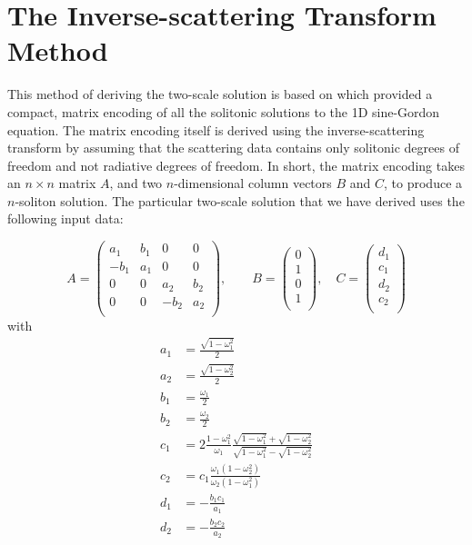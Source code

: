 \documentclass{report}
\begin{document}
\section{The Inverse-scattering Transform Method}
This method of deriving the two-scale solution is based on \cite{:/content/aip/journal/jmp/51/12/10.1063/1.3520596} which provided a compact, matrix encoding of all the solitonic solutions to the 1D sine-Gordon equation. The matrix encoding itself is derived using the inverse-scattering transform by assuming that the scattering data contains only solitonic degrees of freedom and not radiative degrees of freedom. In short, the matrix encoding takes an $n\times n$ matrix $A$, and two $n$-dimensional column vectors $B$ and $C$, to produce a $n$-soliton solution. The particular two-scale solution that we have derived uses the following input data:

\begin{equation}
A=\left(
\begin{array}{cccc}
 a_1 & b_1 & 0 & 0 \\
 -b_1 & a_1 & 0 & 0 \\
 0 & 0 & a_2 & b_2 \\
 0 & 0 & -b_2 & a_2 \\
\end{array}
\right),
\qquad B=\left(\begin{array}{c}
 0 \\
 1 \\
 0 \\
 1 \\
\end{array}\right),
\quad C=\left(\begin{array}{c}
 d_1 \\
 c_1 \\
 d_2 \\
 c_2 \\
\end{array}\right)
\end{equation}
with
\begin{subequations}\label{ivtparams}
  \begin{align}
    a_1 &=\frac{\sqrt{1-\omega_1^2}}{2}\\
    a_2 &=\frac{\sqrt{1-\omega_2^2}}{2}\\
    b_1 &=\frac{\omega_1}{2}\\
    b_2 &=\frac{\omega_2}{2}\\
    c_1 &= 2\frac{1-\omega_1^2}{\omega_1}
    \frac{\sqrt{1-\omega_1^2}+\sqrt{1-\omega_2^2}}{\sqrt{1-\omega_1^2}-\sqrt{1-\omega_2^2}}\\
    c_2 &= c_1 \frac{\omega_1(1-\omega_2^2)}{\omega_2(1-\omega_1^2)}\\
    d_1 &=-\frac{b_1 c_1}{a_1}\\
    d_2 &=-\frac{b_2 c_2}{a_2}
  \end{align}
\end{subequations}
\end{document}

